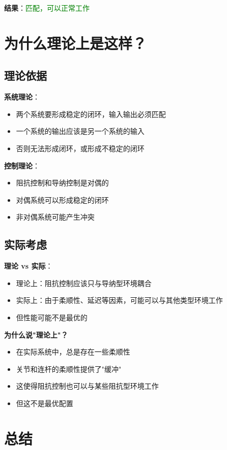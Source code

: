 \documentclass[12pt,a4paper]{article}
\begin{document}
\textbf{结果}：\textcolor{green}{匹配，可以正常工作}

\section{为什么理论上是这样？}

\subsection{理论依据}

\textbf{系统理论}：
\begin{itemize}
\item 两个系统要形成稳定的闭环，输入输出必须匹配
\item 一个系统的输出应该是另一个系统的输入
\item 否则无法形成闭环，或形成不稳定的闭环
\end{itemize}

\textbf{控制理论}：
\begin{itemize}
\item 阻抗控制和导纳控制是对偶的
\item 对偶系统可以形成稳定的闭环
\item 非对偶系统可能产生冲突
\end{itemize}

\subsection{实际考虑}

\textbf{理论 vs 实际}：
\begin{itemize}
\item 理论上：阻抗控制应该只与导纳型环境耦合
\item 实际上：由于柔顺性、延迟等因素，可能可以与其他类型环境工作
\item 但性能可能不是最优的
\end{itemize}

\textbf{为什么说"理论上"？}
\begin{itemize}
\item 在实际系统中，总是存在一些柔顺性
\item 关节和连杆的柔顺性提供了"缓冲"
\item 这使得阻抗控制也可以与某些阻抗型环境工作
\item 但这不是最优配置
\end{itemize}

\section{总结}
\end{document}
